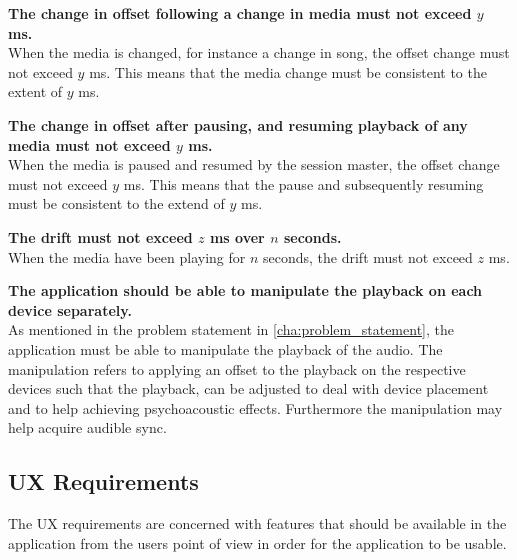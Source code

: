 \begin{eletterate}
\begin{eletterate}
        \item \textbf{The change in offset following a change in media must not exceed $y$ ms.} \hfill\\
            When the media is changed, for instance a change in song, the offset change must not exceed $y$ ms.
            This means that the media change must be consistent to the extent of $y$ ms.

        \item \textbf{The change in offset after pausing, and resuming playback of any media must not exceed $y$ ms.} \hfill\\
            When the media is paused and resumed by the session master, the offset change must not exceed $y$ ms.
            This means that the pause and subsequently resuming must be consistent to the extend of $y$ ms.

        \item \textbf{The drift must not exceed $z$ ms over $n$ seconds.} \hfill\\
            When the media have been playing for $n$ seconds, the drift must not exceed $z$ ms.
    \end{eletterate}

    \item\label{req:manipulate} \textbf{The application should be able to manipulate the playback on each device separately.} \hfill\\
        As mentioned in the problem statement in \cref{cha:problem_statement}, the application must be able to manipulate the playback of the audio.
        The manipulation refers to applying an offset to the playback on the respective devices such that the playback, can be adjusted to deal with device placement and to help achieving psychoacoustic effects.
        Furthermore the manipulation may help acquire audible sync.
\end{eletterate}

\subsection*{\ac{UX} Requirements}
The \ac{UX} requirements are concerned with features that should be available in the application from the users point of view in order for the application to be usable.

